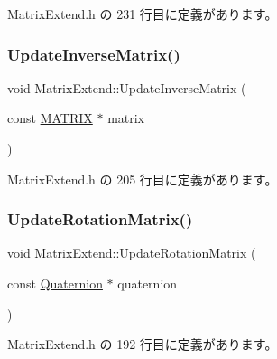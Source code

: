  Matrix\+Extend.\+h の 231 行目に定義があります。

\mbox{\label{class_matrix_extend_a5aa7bce55ed92acb79d21fda51e83146}} 
\subsubsection{\texorpdfstring{Update\+Inverse\+Matrix()}{UpdateInverseMatrix()}}
{\footnotesize\ttfamily void Matrix\+Extend\+::\+Update\+Inverse\+Matrix (\begin{DoxyParamCaption}\item[{const \mbox{\hyperlink{_vector3_d_8h_a032295cd9fb1b711757c90667278e744}{M\+A\+T\+R\+IX}} $\ast$}]{matrix }\end{DoxyParamCaption})\hspace{0.3cm}{\ttfamily [inline]}}



 Matrix\+Extend.\+h の 205 行目に定義があります。

\mbox{\label{class_matrix_extend_afa307701c3147fc345ed10dee054affb}} 
\subsubsection{\texorpdfstring{Update\+Rotation\+Matrix()}{UpdateRotationMatrix()}}
{\footnotesize\ttfamily void Matrix\+Extend\+::\+Update\+Rotation\+Matrix (\begin{DoxyParamCaption}\item[{const \mbox{\hyperlink{_vector3_d_8h_a3ee38c9c46d9851e33a9a1113328dafc}{Quaternion}} $\ast$}]{quaternion }\end{DoxyParamCaption})\hspace{0.3cm}{\ttfamily [inline]}}



 Matrix\+Extend.\+h の 192 行目に定義があります。

\mbox{\label{class_matrix_extend_afc536ab192cd6ef2b9a93861af5bf005}} 
